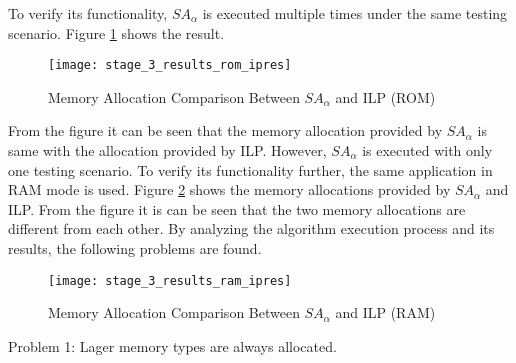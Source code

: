 		To verify its functionality, $SA_{\alpha}$ is executed multiple times under the same
		testing scenario. Figure \ref{fig:stage_3_results_rom_ipres} shows the result.
		\begin{figure}[htb]
			\begin{center}
				\texttt{[image: stage\_3\_results\_rom\_ipres]}
				\caption{Memory Allocation Comparison Between $SA_{\alpha}$ and ILP (ROM)}
				\label{fig:stage_3_results_rom_ipres}
			\end{center}
		\end{figure}		
		From the figure it can be seen that the memory allocation provided by $SA_{\alpha}$ is
		same with the allocation provided by ILP. However, $SA_{\alpha}$ is executed with only
		one testing scenario. To verify its functionality further, the same application in
		RAM mode is used.
		Figure \ref{fig:stage_3_results_ram_ipres} shows the memory allocations provided by $SA_{\alpha}$
		and ILP. From the figure it is can be seen that the two memory allocations are different
		from each other. By analyzing the algorithm execution process and its results,
		the following problems are found.
		\begin{figure}[htb]
			\begin{center}
				\texttt{[image: stage\_3\_results\_ram\_ipres]}
				\caption{Memory Allocation Comparison Between $SA_{\alpha}$ and ILP (RAM)}
				\label{fig:stage_3_results_ram_ipres}
			\end{center}
		\end{figure}

		Problem 1: Lager memory types are always allocated.
		
